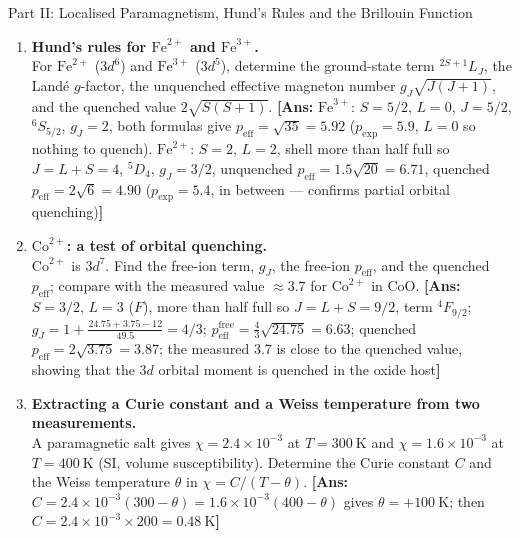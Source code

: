\documentclass[11pt,a4paper]{article}
\begin{document}
\begin{assignmentbox}{Part II: Localised Paramagnetism, Hund's Rules and the Brillouin Function}
\begin{enumerate}[label=\textbf{II.\arabic*.}, leftmargin=*]
    \item \textbf{Hund's rules for $\text{Fe}^{2+}$ and $\text{Fe}^{3+}$.}\\
    For $\text{Fe}^{2+}$ ($3d^6$) and $\text{Fe}^{3+}$ ($3d^5$), determine the ground-state term ${}^{2S+1}L_J$, the Land\'e $g$-factor, the unquenched effective magneton number $g_J\sqrt{J(J+1)}$, and the quenched value $2\sqrt{S(S+1)}$.
    \textbf{[Ans:} $\text{Fe}^{3+}$: $S=5/2$, $L=0$, $J=5/2$, ${}^{6}S_{5/2}$, $g_J = 2$, both formulas give $p_{\mathrm{eff}} = \sqrt{35} = 5.92$ ($p_{\mathrm{exp}} = 5.9$, $L=0$ so nothing to quench). $\text{Fe}^{2+}$: $S=2$, $L=2$, shell more than half full so $J = L+S = 4$, ${}^{5}D_4$, $g_J = 3/2$, unquenched $p_{\mathrm{eff}} = 1.5\sqrt{20} = 6.71$, quenched $p_{\mathrm{eff}} = 2\sqrt{6} = 4.90$ ($p_{\mathrm{exp}} = 5.4$, in between --- confirms partial orbital quenching)\textbf{]}

    \item \textbf{$\text{Co}^{2+}$: a test of orbital quenching.}\\
    $\text{Co}^{2+}$ is $3d^7$. Find the free-ion term, $g_J$, the free-ion $p_{\mathrm{eff}}$, and the quenched $p_{\mathrm{eff}}$; compare with the measured value $\approx 3.7$ for $\text{Co}^{2+}$ in $\text{CoO}$.
    \textbf{[Ans:} $S = 3/2$, $L = 3$ ($F$), more than half full so $J = L+S = 9/2$, term ${}^{4}F_{9/2}$; $g_J = 1 + \frac{24.75+3.75-12}{49.5} = 4/3$; $p_{\mathrm{eff}}^{\mathrm{free}} = \frac{4}{3}\sqrt{24.75} = 6.63$; quenched $p_{\mathrm{eff}} = 2\sqrt{3.75} = 3.87$; the measured 3.7 is close to the quenched value, showing that the $3d$ orbital moment is quenched in the oxide host\textbf{]}

    \item \textbf{Extracting a Curie constant and a Weiss temperature from two measurements.}\\
    A paramagnetic salt gives $\chi = 2.4\times10^{-3}$ at $T = 300\ \mathrm{K}$ and $\chi = 1.6\times10^{-3}$ at $T = 400\ \mathrm{K}$ (SI, volume susceptibility). Determine the Curie constant $C$ and the Weiss temperature $\theta$ in $\chi = C/(T-\theta)$.
    \textbf{[Ans:} $C = 2.4\times10^{-3}(300-\theta) = 1.6\times10^{-3}(400-\theta)$ gives $\theta = +100\ \mathrm{K}$; then $C = 2.4\times10^{-3}\times200 = 0.48\ \mathrm{K}$\textbf{]}


\end{enumerate}
\end{assignmentbox}
\end{document}
